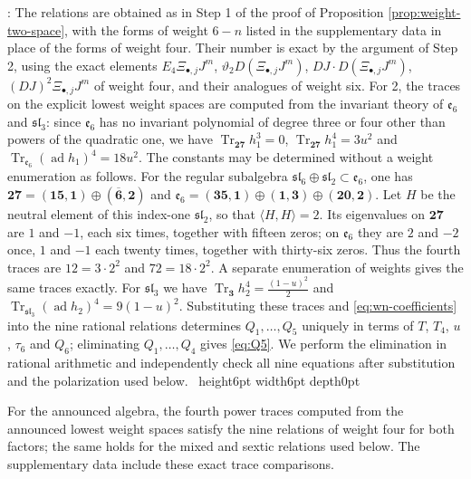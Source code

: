 \documentclass[leqno]{article}
\newcommand{\qed}{\hfill \vrule height6pt  width6pt depth0pt}
\newenvironment{proof}[1][]{\noindent {\it Proof #1} : }{\hbox{~}\qed
\smallskip
}
\numberwithin{equation}{section}
\begin{document}
\begin{proof}
The relations are obtained as in Step 1 of the proof of Proposition \ref{prop:weight-two-space}, with the forms of weight $6-n$ listed in the supplementary data in place of the forms of weight four. Their number is exact by the argument of Step 2, using the exact elements $E_4\Xi_{\bullet,j}J^m$, $\vartheta_2D(\Xi_{\bullet,j}J^m)$, $DJ \cdot D(\Xi_{\bullet,j}J^m)$, $(DJ)^2\Xi_{\bullet,j}J^m$ of weight four, and their analogues of weight six. For 2, the traces on the explicit lowest weight spaces are computed from the invariant theory of $\mathfrak e_6$ and $\mathfrak{sl}_3$: since $\mathfrak e_6$ has no invariant polynomial of degree three or four other than powers of the quadratic one, we have $\operatorname{Tr}_{\mathbf{27}}h_1^3 = 0$, $\operatorname{Tr}_{\mathbf{27}}h_1^4 = 3u^2$ and $\operatorname{Tr}_{\mathfrak e_6}(\operatorname{ad}h_1)^4 = 18u^2$. The constants may be determined without a weight enumeration as follows. For the regular subalgebra $\mathfrak{sl}_6 \oplus \mathfrak{sl}_2 \subset \mathfrak e_6$, one has $\mathbf{27} = (\mathbf{15},\mathbf 1) \oplus (\overline{\mathbf6},\mathbf2)$ and $\mathfrak e_6 = (\mathbf{35},\mathbf1) \oplus (\mathbf1,\mathbf3) \oplus (\mathbf{20},\mathbf2)$. Let $H$ be the neutral element of this index-one $\mathfrak{sl}_2$, so that $\langle H,H\rangle = 2$. Its eigenvalues on $\mathbf{27}$ are $1$ and $-1$, each six times, together with fifteen zeros; on $\mathfrak e_6$ they are $2$ and $-2$ once, $1$ and $-1$ each twenty times, together with thirty-six zeros. Thus the fourth traces are $12 = 3\cdot 2^2$ and $72 = 18\cdot 2^2$. A separate enumeration of weights gives the same traces exactly. For $\mathfrak{sl}_3$ we have $\operatorname{Tr}_{\mathbf 3}h_2^4 = \frac{(1-u)^2}{2}$ and $\operatorname{Tr}_{\mathfrak{sl}_3}(\operatorname{ad}h_2)^4 = 9(1-u)^2$. Substituting these traces and \eqref{eq:wn-coefficients} into the nine rational relations determines $Q_1,\ldots,Q_5$ uniquely in terms of $T$, $T_4$, $u$, $\tau_6$ and $Q_6$; eliminating $Q_1,\ldots,Q_4$ gives \eqref{eq:Q5}. We perform the elimination in rational arithmetic and independently check all nine equations after substitution and the polarization used below.
\end{proof}

For the announced algebra, the fourth power traces computed from the announced lowest weight spaces satisfy the nine relations of weight four for both factors; the same holds for the mixed and sextic relations used below. The supplementary data include these exact trace comparisons.
\end{document}

